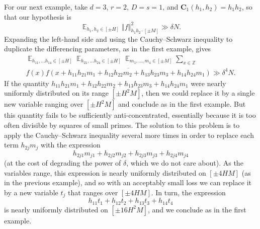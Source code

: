 \documentclass[11pt]{amsart}
\theoremstyle{definition}
\DeclareMathOperator*{\E}{\mathbb{E}}
\newcommand{\bc}{{\textbf{C}}}
\newcommand{\norm}[1]{\left\Vert #1\right\Vert}
\begin{document}
For our next example, take $d=3$, $r=2$, $D=s=1$, and $\bc_1(h_1,h_2)=h_1h_2$, so that our hypothesis is
$$\E_{h_1,h_2 \in [\pm H]} \norm{f}^2_{h_1h_2 \cdot [\pm M]} \gg \delta N.$$
Expanding the left-hand side and using the Cauchy--Schwarz inequality to duplicate the differencing parameters, as in the first example, gives
\begin{multline*}
\E_{h_{11},\ldots h_{14} \in [\pm H]}\E_{h_{21},\ldots h_{24} \in [\pm H]}\E_{m_1,\ldots,m_4 \in [\pm M]}\sum_{x \in \mathbb{Z}}\\
f(x)\overline{f(x+h_{11}h_{21}m_1+h_{12}h_{22}m_2+h_{13}h_{23}m_3+h_{14}h_{24}m_1)} \gg \delta^4 N.
\end{multline*}
If the quantity $h_{11}h_{21}m_1+h_{12}h_{22}m_2+h_{13}h_{23}m_3+h_{14}h_{24}m_1$ were nearly uniformly distributed on its range $[\pm H^2M]$, then we could replace it by a single new variable ranging over $[\pm H^2M]$ and conclude as in the first example.  But this quantity fails to be sufficiently anti-concentrated, essentially because it is too often divisible by squares of small primes.  The solution to this problem is to apply the Cauchy--Schwarz inequality several more times in order to replace each term $h_{2j}m_j$ with the expression
$$h_{2j1}m_{j1}+h_{2j2}m_{j2}+h_{2j3}m_{j3}+h_{2j4}m_{j4}$$
(at the cost of degrading the power of $\delta$, which we do not care about).  As the variables range, this expression is nearly uniformly distributed on $[\pm 4HM]$ (as in the previous example), and so with an acceptably small loss we can replace it by a new variable $t_j$ that ranges over $[\pm 4HM]$.  In turn, the expression
$$h_{11}t_1+h_{12}t_2+h_{13}t_3+h_{14}t_4$$
is nearly uniformly distributed on $[\pm 16 H^2M]$, and we conclude as in the first example.
\end{document}
